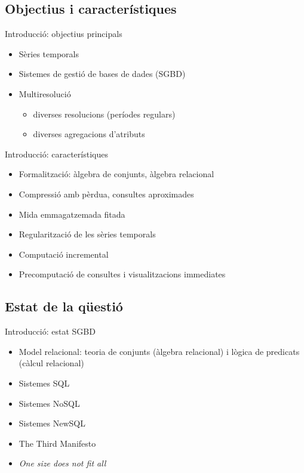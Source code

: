 \subsection{Objectius i característiques}
\begin{frame}{Introducció: objectius principals}

  \begin{itemize}
  \item Sèries temporals
  \item Sistemes de gestió de bases de dades (SGBD)
  \item Multiresolució
    \begin{itemize}
    \item diverses resolucions (períodes regulars)
    \item diverses agregacions d'atributs 
    \end{itemize}
  \end{itemize} 

\end{frame}


\begin{frame}{Introducció: característiques}

  \begin{itemize}
  \item Formalització: àlgebra de conjunts, àlgebra relacional
  \item Compressió amb pèrdua, consultes aproximades
  \item Mida emmagatzemada fitada
  \item Regularització de les sèries temporals
  \item Computació incremental
  \item Precomputació de consultes i visualitzacions immediates
  \end{itemize}

\end{frame}

\subsection{Estat de la qüestió}
\begin{frame}{Introducció: estat SGBD}

  \begin{itemize}
  \item Model relacional: teoria de conjunts (àlgebra relacional) i lògica de predicats (càlcul relacional)
  \item Sistemes SQL
  \item Sistemes NoSQL
  \item Sistemes NewSQL
  \item The Third Manifesto 
  \item \emph{One size does not fit all} \parencite{stonebraker09}
  \end{itemize}

\end{frame}


